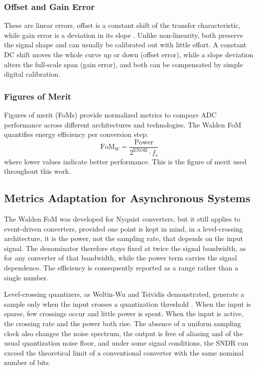 \subsubsection{Offset and Gain Error}
These are linear errors, offset is a constant shift of the transfer characteristic, while gain error is a deviation in its slope \cite{johns_martin_2012}. Unlike non-linearity, both preserve the signal shape and can usually be calibrated out with little effort. A constant DC shift moves the whole curve up or down (offset error), while a slope deviation alters the full-scale span (gain error), and both can be compensated by simple digital calibration.
\par\vspace{1.5em}
\par\vspace{1.5em}
\newpage

\subsubsection{Figures of Merit}
Figures of merit (FoMs) provide normalized metrics to compare ADC performance across different architectures and technologies. The Walden FoM quantifies energy efficiency per conversion step:
\begin{equation}
    \mathrm{FoM}_W = \frac{\mathrm{Power}}{2^{\mathrm{ENOB}} \cdot f_s}
\end{equation}
where lower values indicate better performance. This is the figure of merit used throughout this work.

\subsection{Metrics Adaptation for Asynchronous Systems}

The Walden FoM was developed for Nyquist converters, but it still applies to event-driven converters, provided one point is kept in mind, in a level-crossing architecture, it is the power, not the sampling rate, that depends on the input signal. The denominator therefore stays fixed at twice the signal bandwidth, as for any converter of that bandwidth, while the power term carries the signal dependence. The efficiency is consequently reported as a range rather than a single number.

Level-crossing quantizers, as Weltin-Wu and Tsividis demonstrated, generate a sample only when the input crosses a quantization threshold \cite{weltin2013}. When the input is sparse, few crossings occur and little power is spent. When the input is active, the crossing rate and the power both rise. The absence of a uniform sampling clock also changes the noise spectrum, the output is free of aliasing and of the usual quantization noise floor, and under some signal conditions, the SNDR can exceed the theoretical limit of a conventional converter with the same nominal number of bits.

